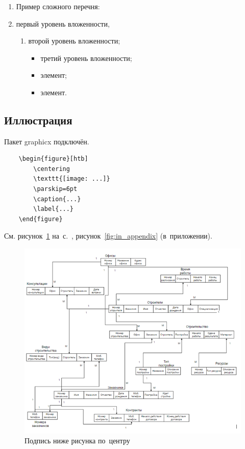 \documentclass{SIBGU-state}
\begin{document}
\subsubsection{}

\begin{enumerate}
	\item[] Пример сложного перечня:
	\item первый уровень вложенности,
	\begin{enumerate}
		\item второй уровень вложенности;
		\begin{itemize}
			\item третий уровень вложенности;
			\item элемент;
			\item элемент.
		\end{itemize}
	\end{enumerate}
\end{enumerate}


\subsection{Иллюстрация}

Пакет graphicx подключён.

\begin{verbatim}
	\begin{figure}[htb]
		\centering
		\texttt{[image: ...]}
		\parskip=6pt
		\caption{...}
		\label{...}
	\end{figure}
\end{verbatim}

См. рисунок~\ref{fig:test_label} на~с.~\pageref{fig:test_label}, рисунок~\ref{fig:in_appendix} (в~приложении).

\begin{figure}[htb]
	\centering
	\includegraphics[width=.5\textwidth]{ris/ris3.png}
	\parskip=6pt
	\caption{Подпись ниже рисунка по~центру}
	\label{fig:test_label}
\end{figure}
\end{document}
